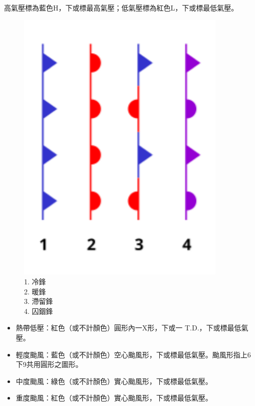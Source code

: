 \documentclass[a4paper,12pt]{report}
\begin{document}
\begin{itemize}
高氣壓標為藍色H，下或標最高氣壓；低氣壓標為紅色L，下或標最低氣壓。
\bct\begin{figure}[H]
    \centering
    \includegraphics[width=0.9\textwidth]{front.png}
    \caption{
1. 冷鋒\\
2. 暖鋒\\
3. 滯留鋒\\
4. 囚錮鋒
}
\end{figure}\FB\ect
{}
\begin{itemize}
\item 熱帶低壓：紅色（或不計顏色）圓形內一X形，下或一 T.D.，下或標最低氣壓。
\item 輕度颱風：藍色（或不計顏色）空心颱風形，下或標最低氣壓。颱風形指上6下9共用圓形之圖形。
\item 中度颱風：綠色（或不計顏色）實心颱風形，下或標最低氣壓。
\item 重度颱風：紅色（或不計顏色）實心颱風形，下或標最低氣壓。
\end{itemize}

\end{itemize}
\end{document}
